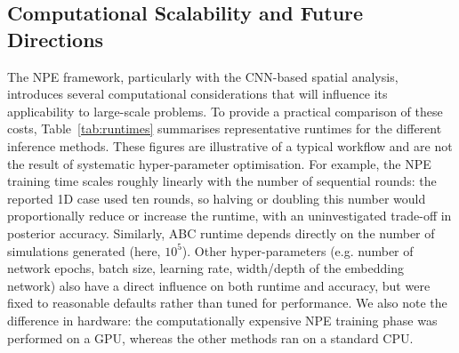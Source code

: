 \documentclass{article}
\providecommand{\DIFdeltex}[1]{{\protect\color{red} \scriptsize #1}} %
\providecommand{\DIFdelbegin}{} %
\providecommand{\DIFdelend}{} %
\providecommand{\DIFdel}[1]{\texorpdfstring{\DIFdeltex{#1}}{}} %
\newcommand{\DIFscaledelfig}{0.5}
\newlength{\DIFdelgraphicswidth} %
\newlength{\DIFdelgraphicsheight} %
\newcommand{\DIFdelincludegraphics}[2][]{%
\sbox{\DIFdelgraphicsbox}{\DIFOincludegraphics[#1]{#2}}%
\settoboxwidth{\DIFdelgraphicswidth}{\DIFdelgraphicsbox} %
\settoboxtotalheight{\DIFdelgraphicsheight}{\DIFdelgraphicsbox} %
\scalebox{\DIFscaledelfig}{%
\parbox[b]{\DIFdelgraphicswidth}{\usebox{\DIFdelgraphicsbox}\\[-\baselineskip] \rule{\DIFdelgraphicswidth}{0em}}\llap{\resizebox{\DIFdelgraphicswidth}{\DIFdelgraphicsheight}{%
\setlength{\unitlength}{\DIFdelgraphicswidth}%
\begin{picture}(1,1)%
\thicklines\linethickness{2pt} %
{\color[rgb]{1,0,0}\put(0,0){\framebox(1,1){}}}%
{\color[rgb]{1,0,0}\put(0,0){\line( 1,1){1}}}%
{\color[rgb]{1,0,0}\put(0,1){\line(1,-1){1}}}%
\end{picture}%
}\hspace*{3pt}}} %
} %
\DeclareRobustCommand{\DIFdelbegin}{\DIFOdelbegin \let\includegraphics\DIFdelincludegraphics} %
\DeclareRobustCommand{\DIFdelend}{\DIFOaddend \let\includegraphics\DIFOincludegraphics} %
\begin{document}

\DIFdelend \subsection{Computational Scalability and Future Directions}
\DIFdelbegin %
\DIFdel{The NPE framework, particularly with the CNN-based spatial analysis, introduces several computational considerations that will influence its applicability to large-scale problems. To provide a practical comparison of these costs, Table~\ref{tab:runtimes} summarises representative runtimes for the different inference methods. These figures are illustrative of a typical workflow and are not the result of systematic hyper-parameter optimisation. For example, the NPE training time scales roughly linearly with the number of sequential rounds: the reported 1D case used ten rounds, so halving or doubling this number would proportionally reduce or increase the runtime, with an uninvestigated trade-off in posterior accuracy. Similarly, ABC runtime depends directly on the number of simulations generated (here, $10^5$). Other hyper-parameters (e.g. number of network epochs, batch size, learning rate,  width/depth of the embedding network) also have a direct influence on both runtime and accuracy, but were fixed to reasonable defaults rather than tuned for performance. We also note the difference in hardware: the computationally expensive NPE training phase was performed on a GPU, whereas the other methods ran on a standard CPU. }%
\DIFdelend 
\end{document}
